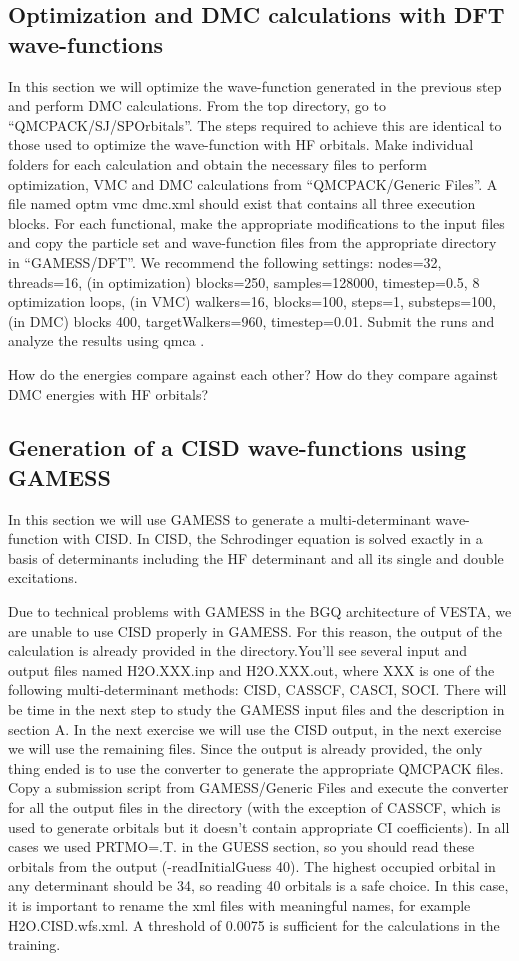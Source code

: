 \subsection{Optimization and DMC calculations with DFT wave-functions}
In this section we will optimize the wave-function generated in the previous step and
perform DMC calculations. From the top directory, go to “QMCPACK/SJ/SPOrbitals”.
The steps required to achieve this are identical to those used to optimize the wave-function
with HF orbitals. Make individual folders for each calculation and obtain the necessary files
to perform optimization, VMC and DMC calculations from “QMCPACK/Generic Files”.
A file named optm vmc dmc.xml should exist that contains all three execution blocks. For
each functional, make the appropriate modifications to the input files and copy the particle 
set and wave-function files from the appropriate directory in “GAMESS/DFT”. We
recommend the following settings: nodes=32, threads=16, (in optimization) blocks=250,
samples=128000, timestep=0.5, 8 optimization loops, (in VMC) walkers=16, blocks=100,
steps=1, substeps=100, (in DMC) blocks 400, targetWalkers=960, timestep=0.01. Submit
the runs and analyze the results using qmca .

How do the energies compare against each other? How do they compare against DMC
energies with HF orbitals?


\subsection{Generation of a CISD wave-functions using GAMESS}
In this section we will use GAMESS to generate a multi-determinant wave-function with
CISD. In CISD, the Schrodinger equation is solved exactly in a basis of determinants 
including the HF determinant and all its single and double excitations.

Due to technical problems with GAMESS in the BGQ architecture of VESTA, we are
unable to use CISD properly in GAMESS. For this reason, the output of the calculation is 
already provided in the directory.You’ll see several input and output files named H2O.XXX.inp
and H2O.XXX.out, where XXX is one of the following multi-determinant methods: CISD,
CASSCF, CASCI, SOCI. There will be time in the next step to study the GAMESS input
files and the description in section A. In the next exercise we will use the CISD output, in
the next exercise we will use the remaining files. Since the output is already provided, the
only thing ended is to use the converter to generate the appropriate QMCPACK files. Copy
a submission script from GAMESS/Generic Files and execute the converter for all the output 
files in the directory (with the exception of CASSCF, which is used to generate orbitals
but it doesn’t contain appropriate CI coefficients). In all cases we used PRTMO=.T. in the
GUESS section, so you should read these orbitals from the output (-readInitialGuess 40).
The highest occupied orbital in any determinant should be 34, so reading 40 orbitals is a
safe choice. In this case, it is important to rename the xml files with meaningful names, for
example H2O.CISD.wfs.xml. A threshold of 0.0075 is sufficient for the calculations in the
training.


